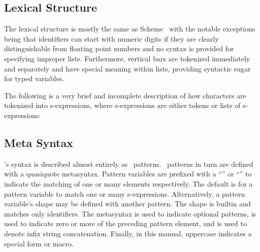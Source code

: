 \documentclass[twoside,twocolumn,9pt]{extarticle}
\begin{document}
\subsection{Lexical Structure}

The lexical structure is mostly the same as 
Scheme~\cite{Kelsey:Clinger:Rees:hosc:1998} with
the notable exceptions being that identifiers can start with numeric digits
if they are clearly distinguishable from floating point numbers and
no syntax is provided for specifying improper lists.
Furthermore, vertical bars are tokenized immediately and separately and have
special meaning within lists, providing syntactic sugar for typed
variables.

The following is a very brief and incomplete description
of how characters are tokenized into s-expressions, where
s-expressions are either tokens or lists of s-expressions:

\begin{defs}
\end{defs}

\subsection{Meta Syntax}

\goo's syntax is described almost entirely as \goo\ patterns.  \goo\
patterns in turn are defined with a quasiquote metasyntax.  Pattern
variables are prefixed with a ``\kode{,}'' or ``\kode{,@}'' to
indicate the matching of one or many elements respectively.  The
default is for a pattern variable to match one or many s-expressions.  
Alternatively, a pattern variable's shape may be defined with another
pattern. 
The  shape is builtin and matches only identifiers.
The  metasyntax is used to indicate optional
patterns,  is used to indicate zero or more of the
preceding pattern element, and \kode{\#\#} is used to denote infix
string concatenation.
Finally, in this manual, uppercase indicates a special form or macro.
\end{document}
